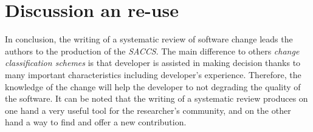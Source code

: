\documentclass[12pt]{article}
\begin{document}
\section{Discussion an re-use}
In conclusion, the writing of a systematic review of software change leads the authors to the production of the \textit{SACCS}. The main difference to others \textit{change classification schemes} is that developer is assisted in making decision thanks to many important characteristics including developer's experience. Therefore, the knowledge of the change will help the developer to not degrading the quality of the software. It can be noted that the writing of a systematic review produces on one hand a very useful tool for the researcher's community, and on the other hand a way to find and offer a new contribution.
\end{document}
